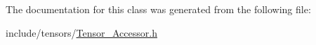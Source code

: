The documentation for this class was generated from the following file\+:\begin{DoxyCompactItemize}
\item 
include/tensors/\hyperlink{Tensor__Accessor_8h}{Tensor\+\_\+\+Accessor.\+h}\end{DoxyCompactItemize}
